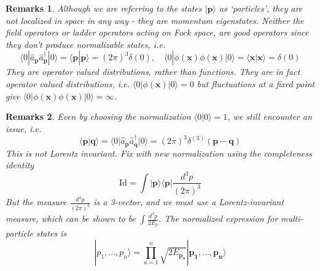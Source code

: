\documentclass[a4paper]{article}
\newtheorem{remarks}{Remarks}[section]
\theoremstyle{new}
\begin{document}
\begin{remarks}
Although we are referring to the states $|\mathbf{p}\rangle$ as `particles', they are not localized in space in any way - they are momentum eigenstates. Neither the field operators or ladder operators acting on Fock space, are good operators since they don't produce normalizable states, i.e.
$$\langle 0|\hat{a}_{\mathbf{p}}\hat{a}_{\mathbf{p}}^\dag|0\rangle=\langle\mathbf{p}|\mathbf{p}\rangle=(2\pi)^3\delta(0),\quad\langle 0|\phi(\mathbf{x})\phi(\mathbf{x})|0\rangle=\langle\mathbf{x}|\mathbf{x}\rangle=\delta(0)$$
They are operator valued distributions, rather than functions. They are in fact operator valued distributions, i.e. $\langle 0|\phi(\mathbf{x})|0\rangle=0$ but fluctuations at a fixed point give $\langle 0|\phi(\mathbf{x})\phi(\mathbf{x})|0\rangle=\infty$. 
\end{remarks}
\begin{remarks}
Even by choosing the normalization $\langle 0|0\rangle=1$, we still encounter an issue, i.e.
$$\langle\mathbf{p}|\mathbf{q}\rangle=\langle 0|\hat{a}_{\mathbf{p}}\hat{a}_{\mathbf{q}}^\dag|0\rangle=(2\pi)^3\delta^{(3)}(\mathbf{p}-\mathbf{q})$$
This is not Lorentz invariant. Fix with new normalization using the completeness identity
$$\text{Id}=\int|\mathbf{p}\rangle\langle\mathbf{p}|\frac{d^3p}{(2\pi)^3}$$
But the measure $\frac{d^3p}{(2\pi)^3}$ is a 3-vector, and we must use a Lorentz-invariant measure, which can be shown to be $\int\frac{d^3p}{2E_p}$. The normalized expression for multi-particle states is
$$|p_1,\dots,p_n\rangle=\prod_{a=1}^n\sqrt{2E_{\mathbf{p_a}}}|\mathbf{p_1},\dots,\mathbf{p_n}\rangle$$
\end{remarks}



\newpage
\end{document}
